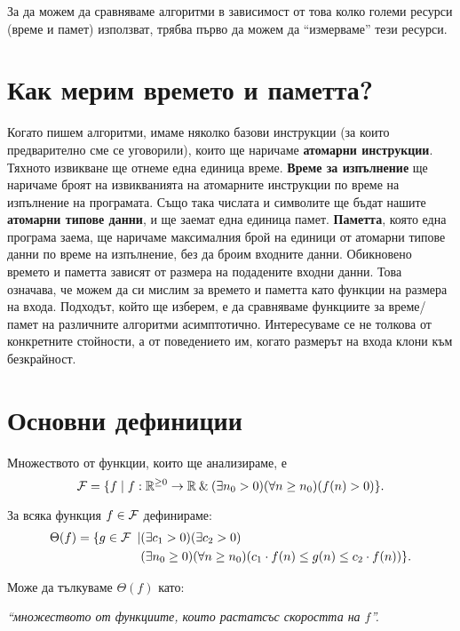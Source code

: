 За да можем да сравняваме алгоритми в зависимост от това колко големи ресурси (време и памет) използват, трябва първо да можем да ``измерваме'' тези ресурси.

\section{Как мерим времето и паметта?}

Когато пишем алгоритми, имаме няколко базови инструкции (за които предварително сме се уговорили), които ще наричаме \textbf{атомарни инструкции}.
Тяхното извикване ще отнеме една единица време.
\textbf{Време за изпълнение} ще наричаме броят на извикванията на атомарните инструкции по време на изпълнение на програмата.
Също така числата и символите ще бъдат нашите \textbf{атомарни типове данни}, и ще заемат една единица памет.
\textbf{Паметта}, която една програма заема, ще наричаме максималния брой на единици от атомарни типове данни по време на изпълнение, без да броим входните данни.
Обикновено времето и паметта зависят от размера на подадените входни данни.
Това означава, че можем да си мислим за времето и паметта като функции на размера на входа.
Подходът, който ще изберем, е да сравняваме функциите за време/памет на различните алгоритми асимптотично.
Интересуваме се не толкова от конкретните стойности, а от поведението им, когато размерът на входа клони към безкрайност.

\section{Основни дефиниции}
Множеството от функции, които ще анализираме, е
\[
  \mathcal{F} = \{ f \mid f : \mathbb{R}^{\geq 0} \rightarrow \mathbb{R} \: \& \: (\exists n_0 > 0) (\forall n \geq n_0) (f(n) > 0) \}.
\]


\begin{definition}
  За всяка функция $f \in \mathcal{F}$ дефинираме:
  \begin{align*}
    \Theta(f) = \{ g \in \mathcal{F} \: \mid & (\exists c_1 > 0)(\exists c_2 > 0)                                                        \\
                                       & (\exists n_0 \geq 0)(\forall n \geq n_0)(c_1 \cdot f(n) \leq g(n) \leq c_2 \cdot f(n))\}.
  \end{align*}

\end{definition}
Може да тълкуваме $\Theta(f)$ като:
\begin{center}
  \textit{``множеството от функциите, които растат\footnotemark[1] със скоростта на $f$''.}
\end{center}


